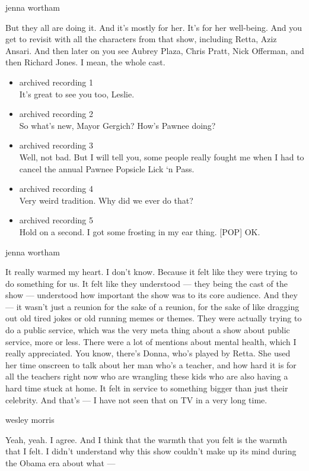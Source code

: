 jenna wortham

But they all are doing it. And it's mostly for her. It's for her
well-being. And you get to revisit with all the characters from that
show, including Retta, Aziz Ansari. And then later on you see Aubrey
Plaza, Chris Pratt, Nick Offerman, and then Richard Jones. I mean, the
whole cast.

\begin{itemize}
\item
  archived recording 1\\
  It's great to see you too, Leslie.
\item
  archived recording 2\\
  So what's new, Mayor Gergich? How's Pawnee doing?
\item
  archived recording 3\\
  Well, not bad. But I will tell you, some people really fought me when
  I had to cancel the annual Pawnee Popsicle Lick `n Pass.
\item
  archived recording 4\\
  Very weird tradition. Why did we ever do that?
\item
  archived recording 5\\
  Hold on a second. I got some frosting in my ear thing. {[}POP{]} OK.
\end{itemize}

jenna wortham

It really warmed my heart. I don't know. Because it felt like they were
trying to do something for us. It felt like they understood --- they
being the cast of the show --- understood how important the show was to
its core audience. And they --- it wasn't just a reunion for the sake of
a reunion, for the sake of like dragging out old tired jokes or old
running memes or themes. They were actually trying to do a public
service, which was the very meta thing about a show about public
service, more or less. There were a lot of mentions about mental health,
which I really appreciated. You know, there's Donna, who's played by
Retta. She used her time onscreen to talk about her man who's a teacher,
and how hard it is for all the teachers right now who are wrangling
these kids who are also having a hard time stuck at home. It felt in
service to something bigger than just their celebrity. And that's --- I
have not seen that on TV in a very long time.

wesley morris

Yeah, yeah. I agree. And I think that the warmth that you felt is the
warmth that I felt. I didn't understand why this show couldn't make up
its mind during the Obama era about what ---

